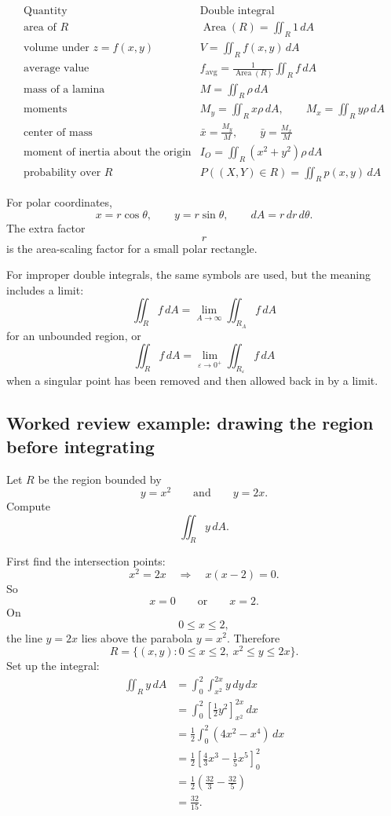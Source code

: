 \[
\begin{array}{c|c}
\text{Quantity} & \text{Double integral} \\ \hline
\text{area of }R
&
\displaystyle \operatorname{Area}(R)=\iint_R 1\,dA
\\[3mm]
\text{volume under }z=f(x,y)
&
\displaystyle V=\iint_R f(x,y)\,dA
\\[3mm]
\text{average value}
&
\displaystyle f_{\mathrm{avg}}
=
\frac{1}{\operatorname{Area}(R)}\iint_R f\,dA
\\[4mm]
\text{mass of a lamina}
&
\displaystyle M=\iint_R \rho\,dA
\\[3mm]
\text{moments}
&
\displaystyle M_y=\iint_R x\rho\,dA,
\qquad
M_x=\iint_R y\rho\,dA
\\[4mm]
\text{center of mass}
&
\displaystyle
\bar x=\frac{M_y}{M},
\qquad
\bar y=\frac{M_x}{M}
\\[4mm]
\text{moment of inertia about the origin}
&
\displaystyle
I_O=\iint_R (x^2+y^2)\rho\,dA
\\[4mm]
\text{probability over }R
&
\displaystyle
P((X,Y)\in R)=\iint_R p(x,y)\,dA
\end{array}
\]

For polar coordinates,
\[
\boxed{
    x=r\cos\theta,
    \qquad
    y=r\sin\theta,
    \qquad
    dA=r\,dr\,d\theta.
}
\]
The extra factor
\[
    r
\]
is the area-scaling factor for a small polar rectangle.

For improper double integrals, the same symbols are used, but the meaning includes a
limit:
\[
\boxed{
    \iint_R f\,dA
    =
    \lim_{A\to\infty}\iint_{R_A}f\,dA
}
\]
for an unbounded region, or
\[
\boxed{
    \iint_R f\,dA
    =
    \lim_{\varepsilon\to0^+}\iint_{R_\varepsilon}f\,dA
}
\]
when a singular point has been removed and then allowed back in by a limit.

\subsection{Worked review example: drawing the region before integrating}

Let \(R\) be the region bounded by
\[
    y=x^2
    \qquad\text{and}\qquad
    y=2x.
\]
Compute
\[
    \iint_R y\,dA.
\]

First find the intersection points:
\[
    x^2=2x
    \quad\Longrightarrow\quad
    x(x-2)=0.
\]
So
\[
    x=0
    \qquad\text{or}\qquad
    x=2.
\]
On
\[
    0\le x\le2,
\]
the line \(y=2x\) lies above the parabola \(y=x^2\).  Therefore
\[
    R=\{(x,y):0\le x\le2,\ x^2\le y\le 2x\}.
\]
Set up the integral:
\[
\begin{aligned}
\iint_R y\,dA
&=
\int_0^2\int_{x^2}^{2x} y\,dy\,dx\\
&=
\int_0^2
\left[\frac12y^2\right]_{x^2}^{2x}\,dx\\
&=
\frac12\int_0^2(4x^2-x^4)\,dx\\
&=
\frac12\left[\frac43x^3-\frac15x^5\right]_0^2\\
&=
\frac12\left(\frac{32}{3}-\frac{32}{5}\right)\\
&=
\boxed{\frac{32}{15}}.
\end{aligned}
\]

